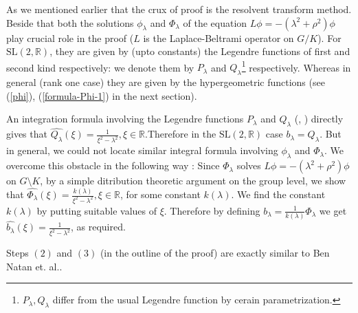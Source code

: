 \documentclass[11pt,reqno]{amsart}
\newcommand{\what}{\widehat}%
\newcommand{\R}{\mathbb R}%
\theoremstyle{definition}
\theoremstyle{definition}
\numberwithin{equation}{section}
\begin{document}
 As we mentioned earlier that the crux of proof is the resolvent transform method. Beside that both the solutions $\phi_\lambda$ and $\Phi_\lambda$ of the equation $L\phi=-(\lambda^2 + \rho^2)\phi$ play crucial role in the proof ($L$ is the Laplace-Beltrami operator on $G/K$). For $\mathrm{SL}(2, \R)$, they are given by (upto constants) the Legendre functions of first  and second kind respectively: we denote them by  $P_\lambda$ and $Q_\lambda$\footnote{ $P_\lambda, Q_\lambda$ differ from the usual Legendre function by cerain parametrization.} respectively. Whereas in general (rank one case) they are given by the hypergeometric functions (see (\ref{phi}), (\ref{formula-Phi-1}) in the next section).   
 
An integration formula involving the Legendre functions $P_\lambda$ and $Q_\lambda$ (\cite[p. 770, 7.114 (1)]{Grad}, \cite[(2-11)]{Ben-2}) directly gives that $\what{Q_\lambda}(\xi)=\frac{1}{\xi^2-\lambda^2}, \xi\in\R.$Therefore in the $\mathrm{SL}(2, \R)$ case $b_\lambda=Q_\lambda$. But in general, we could not locate similar integral formula involving $\phi_\lambda$ and $\Phi_\lambda$. We overcome this obstacle in the following way : 
Since $\Phi_\lambda$ solves $L\phi=-(\lambda^2 + \rho^2)\phi$ on $G\setminus K$, by a simple ditribution theoretic argument on the group level, we show that $\what{\Phi_\lambda}(\xi)=\frac{k(\lambda)}{\xi^2-\lambda^2}, \xi\in\R$, for some constant $k(\lambda)$. We find the constant $k(\lambda)$ by putting suitable values of $\xi$. Therefore by defining $b_\lambda=\frac{1}{k(\lambda)}\Phi_\lambda$ we get $\what{b_\lambda}(\xi)=\frac{1}{\xi^2-\lambda^2}$, as required.

Steps $(2)$ and $(3)$ (in the outline of the proof) are exactly similar to Ben Natan et. al..
\end{document}
